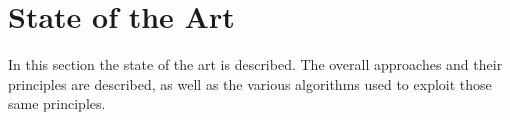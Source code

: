 \chapter{State of the Art}
\label{sec:stateofart}

In this section the state of the art is described. The overall approaches and
their principles are described, as well as the various algorithms used to
exploit those same principles.







